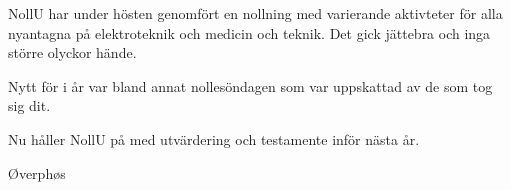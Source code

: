 \documentclass[../_main/handlingar.tex]{subfiles}
\begin{document}
NollU har under hösten genomfört en nollning med varierande aktivteter för alla nyantagna på elektroteknik och medicin och teknik. Det gick jättebra och inga större olyckor hände.

Nytt för i år var bland annat nollesöndagen som var uppskattad av de som tog sig dit.

Nu håller NollU på med utvärdering och testamente inför nästa år.

\begin{signatures}{1}
    \mvh
    \signature{Niklas Gustafson}{Øverphøs}
\end{signatures}
\end{document}
